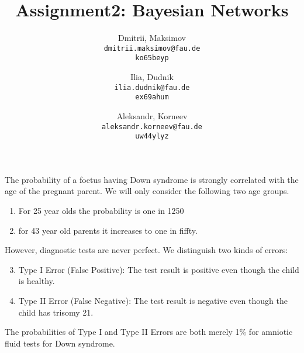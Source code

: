 \documentclass{homework}
\title{Assignment2: Bayesian Networks}
\author{
  Dmitrii, Maksimov\\
  \texttt{dmitrii.maksimov@fau.de} \\
  \texttt{ko65beyp}
  \and
  Ilia, Dudnik\\
  \texttt{ilia.dudnik@fau.de}\\
  \texttt{ex69ahum}
  \and
  Aleksandr, Korneev\\
  \texttt{aleksandr.korneev@fau.de}\\
  \texttt{uw44ylyz}
}
\begin{document}
\maketitle


The probability of a foetus having Down syndrome is strongly correlated
with the age of the pregnant parent. We will only consider the following two age groups.
\begin{enumerate}
	\item For 25 year olds the probability is one in 1250
	\item for 43 year old parents it increases to one in fiffty.
\end{enumerate}
However, diagnostic tests are never perfect. We distinguish two kinds of errors:
\begin{enumerate}
	\setcounter{enumi}{2}
	\item Type I Error (False Positive): The test result is positive even though the child is healthy.
	\item Type II Error (False Negative): The test result is negative even though the child has trisomy 21.
\end{enumerate}
The probabilities of Type I and Type II Errors are both merely 1\% for amniotic fluid tests for Down syndrome.
\end{document}
